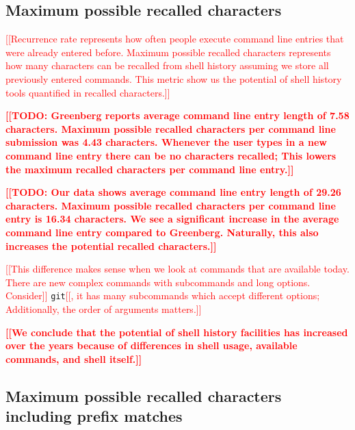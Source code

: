 \documentclass[thesis=M,english]{FITthesis}[2012/10/20]
\newcommand{\todotext}[1]{\textcolor{red}{\textbf{[[#1]]}}}
\newcommand{\redtext}[1]{\textcolor{red}{[[#1]]}}
\newcommand{\tmpframe}[1]{\fbox{#1}}
\renewcommand{\tmpframe}[1]{#1}
\begin{document}


\subsection{Maximum possible recalled characters}

\redtext{Recurrence rate represents how often people execute command line entries that were already entered before. Maximum possible recalled characters represents how many characters can be recalled from shell history assuming we store all previously entered commands. This metric show us the potential of shell history tools quantified in recalled characters.}

\todotext{TODO: Greenberg reports average command line entry length of 7.58 characters. Maximum possible recalled characters per command line submission was 4.43 characters. Whenever the user types in a new command line entry there can be no characters recalled; This lowers the maximum recalled characters per command line entry.}

\todotext{TODO: Our data shows average command line entry length of 29.26 characters. Maximum possible recalled characters per command line entry is 16.34 characters. We see a significant increase in the average command line entry compared to Greenberg. Naturally, this also increases the potential recalled characters.}

\redtext{This difference makes sense when we look at commands that are available today. There are new complex commands with subcommands and long options. Consider} \verb|git|\redtext{, it has many subcommands which accept different options; Additionally, the order of arguments matters.}


\todotext{We conclude that the potential of shell history facilities has increased over the years because of differences in shell usage, available commands, and shell itself.}

\subsection{Maximum possible recalled characters including prefix matches}
\end{document}
